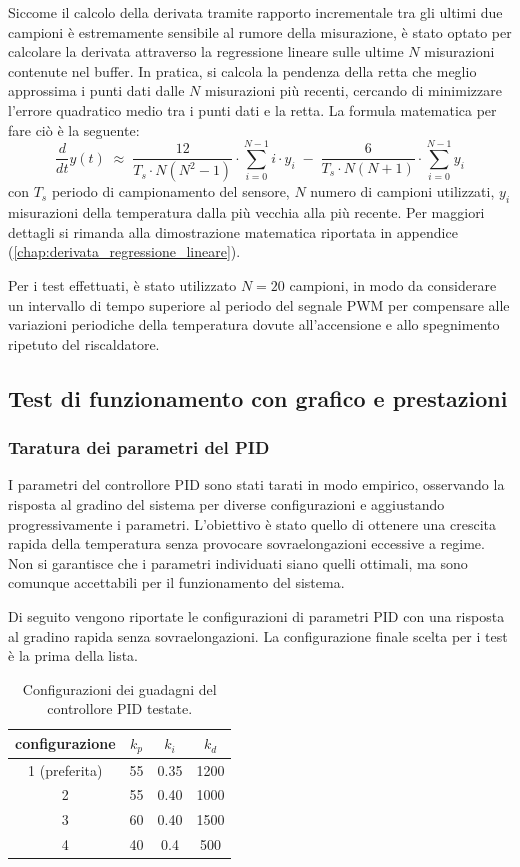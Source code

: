 Siccome il calcolo della derivata tramite rapporto incrementale tra gli ultimi due campioni è estremamente sensibile al rumore della
misurazione, è stato optato per calcolare la derivata attraverso la regressione lineare sulle ultime \(N\) misurazioni contenute nel
buffer. In pratica, si calcola la pendenza della retta che meglio approssima i punti dati dalle \(N\) misurazioni più recenti,
cercando di minimizzare l'errore quadratico medio tra i punti dati e la retta. La formula matematica per fare ciò è la seguente:
\begin{equation}
	\frac{d}{dt} y(t) \; \approx \; \frac{12}{T_s \cdot N(N^2-1)} \cdot \sum_{i=0}^{N-1} i \cdot y_i \; - \; \frac{6}{T_s \cdot N(N+1)} \cdot \sum_{i=0}^{N-1} y_i
\end{equation}
con \(T_s\) periodo di campionamento del sensore, \(N\) numero di campioni utilizzati, \(y_i\) misurazioni della temperatura dalla
più vecchia alla più recente. Per maggiori dettagli si rimanda alla dimostrazione matematica riportata in appendice
(\autoref{chap:derivata_regressione_lineare}).

Per i test effettuati, è stato utilizzato \(N=20\) campioni, in modo da considerare un intervallo di tempo superiore al periodo del
segnale PWM per compensare alle variazioni periodiche della temperatura dovute all'accensione e allo spegnimento ripetuto del riscaldatore.

\subsection{Test di funzionamento con grafico e prestazioni}
\subsubsection{Taratura dei parametri del PID}
I parametri del controllore PID sono stati tarati in modo empirico, osservando la risposta al gradino del sistema per
diverse configurazioni e aggiustando progressivamente i parametri. L'obiettivo è stato quello di ottenere una crescita
rapida della temperatura senza provocare sovraelongazioni eccessive a regime. Non si garantisce che i parametri individuati
siano quelli ottimali, ma sono comunque accettabili per il funzionamento del sistema.

Di seguito vengono riportate le configurazioni di parametri PID con una risposta al gradino rapida senza sovraelongazioni.
La configurazione finale scelta per i test è la prima della lista.

\begin{table}[htbp]
	\centering
	\begin{tabular}{c | c | c | c}
		\textbf{configurazione} & \(k_p\) & \(k_i\) & \(k_d\) \\
		\toprule
		1 (preferita) & 55 & 0.35 & 1200 \\
		\midrule
		2 & 55 & 0.40 & 1000 \\
		\midrule
		3 & 60 & 0.40 & 1500 \\
		\midrule
		4 & 40 & 0.4 & 500
	\end{tabular}
	\caption[Configurazioni del controllore PID]{Configurazioni dei guadagni del controllore PID testate.}
	\label{tab:configurazioni_pid}
\end{table}

